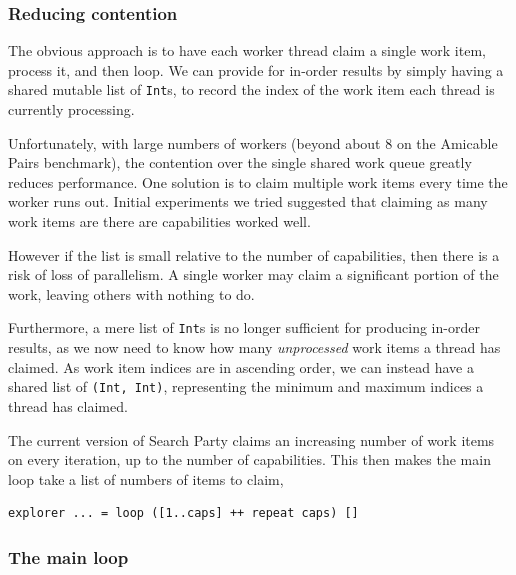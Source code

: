 \subsubsection*{Reducing contention}
\label{sec:searchparty-impl-multi-contention}

The obvious approach is to have each worker thread claim a single work
item, process it, and then loop. We can provide for in-order results
by simply having a shared mutable list of \verb|Int|s, to record the
index of the work item each thread is currently processing.

Unfortunately, with large numbers of workers (beyond about 8 on the
Amicable Pairs benchmark), the contention over the single shared work
queue greatly reduces performance. One solution is to claim multiple
work items every time the worker runs out. Initial experiments we
tried suggested that claiming as many work items are there are
capabilities worked well.

However if the list is small relative to the number of capabilities,
then there is a risk of loss of parallelism. A single worker may claim
a significant portion of the work, leaving others with nothing to do.

Furthermore, a mere list of \verb|Int|s is no longer sufficient for
producing in-order results, as we now need to know how many
\textit{unprocessed} work items a thread has claimed. As work item
indices are in ascending order, we can instead have a shared list of
\verb|(Int, Int)|, representing the minimum and maximum indices a
thread has claimed.

The current version of Search Party claims an increasing number of
work items on every iteration, up to the number of capabilities. This
then makes the main loop take a list of numbers of items to claim,

\begin{verbatim}
explorer ... = loop ([1..caps] ++ repeat caps) []
\end{verbatim}

\subsubsection*{The main loop}
\label{sec:searchparty-impl-multi-loop}

